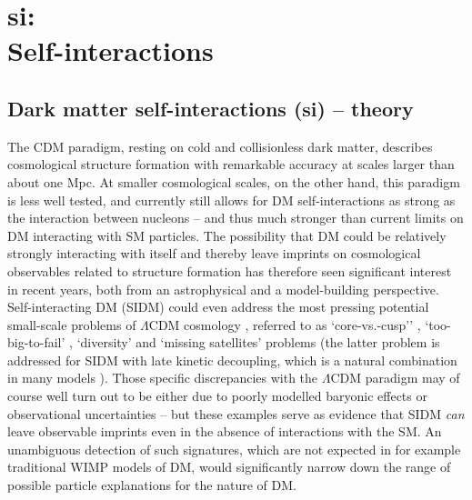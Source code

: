 \documentclass[a4paper,10pt,oneside]{book}
\newcommand{\codeb}[1]{\ftb{#1}}
\newcommand{\ftb}[1]{{\bfseries \sffamily #1}}
\begin{document}
\chapter[si: Self-interactions]{\codeb{si}:\\ Self-interactions}
\label{ch:src/si}

\section{Dark matter self-interactions (si) -- theory}
\label{sec:si}

The CDM paradigm, resting on cold and collisionless dark matter, describes cosmological structure 
formation with remarkable accuracy at scales larger than about one Mpc. At smaller cosmological scales, 
on the other hand, this  paradigm is less well tested, and currently still allows for DM self-interactions  
as strong as the interaction between nucleons --  and thus much stronger than current limits on
DM interacting with SM particles. The possibility that DM could be relatively strongly interacting with itself \cite{Spergel:1999mh}
and thereby leave imprints on cosmological observables related to structure formation
has therefore seen significant interest in recent years, both from an astrophysical and a model-building
perspective. Self-interacting DM (SIDM) could even address \cite{Loeb:2010gj,Vogelsberger:2012ku,Peter:2012jh,
Zavala:2012us,Aarssen:2012fx,Elbert:2014bma,Kamada:2016euw,Robertson:2017mgj} the most pressing 
potential small-scale problems of $\Lambda$CDM cosmology 
\cite{Bullock:2017xww}, referred to as `core-vs.-cusp'' \cite{Flores:1994gz,Moore:1994yx}, `too-big-to-fail'
\cite{BoylanKolchin:2011de,BoylanKolchin:2011dk}, `diversity'  \cite{Oman:2015xda,Oman:2016zjn}
and `missing satellites' problems \cite{Moore:1999nt,Klypin:1999uc} (the latter problem is addressed for 
SIDM with late kinetic decoupling, which is a natural combination in many models \cite{Bringmann:2016ilk}).
Those specific discrepancies with the $\Lambda$CDM paradigm may of course well turn out to be either
due to  poorly modelled baryonic effects or observational uncertainties -- but these examples serve as 
evidence that SIDM {\it can} leave observable imprints even in the absence of interactions with the SM.
An unambiguous detection of such signatures, which are not expected in for example traditional
WIMP models of DM, would significantly narrow down the range of possible particle explanations
for the nature of DM.
\end{document}
